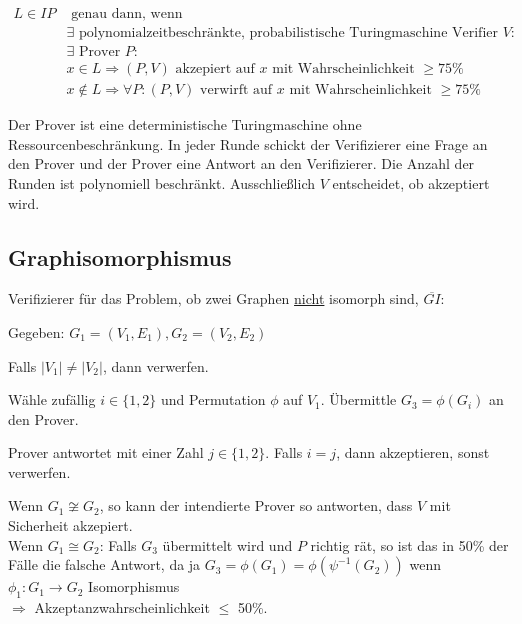 


\begin{definition}
    \begin{align*}
        L \in \mathit{IP} & \text{ genau dann, wenn }
        \\
        & \exists \text{ polynomialzeitbeschränkte, probabilistische Turingmaschine Verifier } V:
        \\
        & \exists \text{ Prover } P:
        \\
        & x \in L \Rightarrow (P,V) \text{ akzepiert auf } x \text{ mit Wahrscheinlichkeit } \geq 75\%
        \\
        & x \notin L \Rightarrow \forall P: (P,V) \text{ verwirft auf } x \text{ mit Wahrscheinlichkeit } \geq 75\%
    \end{align*}

    Der Prover ist eine deterministische Turingmaschine ohne
    Ressourcenbeschränkung. In jeder Runde schickt der Verifizierer eine Frage
    an den Prover und der Prover eine Antwort an den Verifizierer.
    Die Anzahl der Runden ist polynomiell beschränkt.
    Ausschließlich $V$ entscheidet, ob akzeptiert wird.

\end{definition}






\subsection{Graphisomorphismus}
\label{sec:graphisomorphismus}


Verifizierer für das Problem, ob zwei Graphen \underline{nicht} isomorph sind, $\overline{GI}$:

Gegeben: $G_1 = (V_1, E_1), G_2 = (V_2, E_2)$

Falls $|V_1| \neq |V_2|$, dann verwerfen.

Wähle zufällig $i \in \{1,2\}$ und Permutation $\phi$ auf $V_1$.
Übermittle $G_3 = \phi(G_i)$ an den Prover.

Prover antwortet mit einer Zahl $j \in \{1,2\}$. Falls $i=j$, dann akzeptieren, sonst verwerfen.

Wenn $G_1 \not\cong G_2$, so kann der intendierte Prover so antworten, dass
$V$ mit Sicherheit akzepiert.
\\
Wenn $G_1 \cong G_2$: Falls $G_3$ übermittelt wird und $P$ richtig rät, so ist
das in 50\% der Fälle die falsche Antwort, da ja
$G_3 = \phi(G_1) = \phi(\psi^{-1}(G_2))$
wenn $\phi_1: G_1 \rightarrow G_2$ Isomorphismus
\\
$\Rightarrow$ Akzeptanzwahrscheinlichkeit $\leq$ 50\%.



